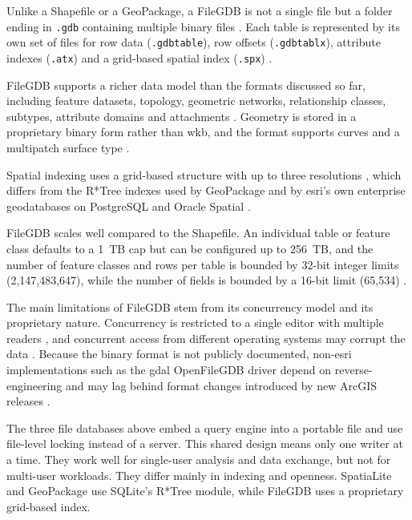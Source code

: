 Unlike a Shapefile or a GeoPackage, a FileGDB is not a single file but a folder ending in \texttt{.gdb} containing multiple binary files \parencite{rouault2013_filegdb_format_specification, gdal2025_openfilegdb_driver}. Each table is represented by its own set of files for row data (\texttt{.gdbtable}), row offsets (\texttt{.gdbtablx}), attribute indexes (\texttt{.atx}) and a grid-based spatial index (\texttt{.spx}) \parencite{rouault2013_filegdb_format_specification}.

FileGDB supports a richer data model than the formats discussed so far, including feature datasets, topology, geometric networks, relationship classes, subtypes, attribute domains and attachments \parencite{esri2024_file_geodatabases_overview}. Geometry is stored in a proprietary binary form rather than \acrshort{wkb}, and the format supports curves and a multipatch surface type \parencite{rouault2013_filegdb_format_specification}.

Spatial indexing uses a grid-based structure with up to three resolutions \parencite{rouault2013_filegdb_format_specification, esri2024_spatial_indexes}, which differs from the R*Tree indexes used by GeoPackage and by \acrshort{esri}'s own enterprise geodatabases on PostgreSQL and Oracle Spatial \parencite{esri2024_spatial_indexes}.

FileGDB scales well compared to the Shapefile. An individual table or feature class defaults to a 1~TB cap but can be configured up to 256~TB, and the number of feature classes and rows per table is bounded by 32-bit integer limits (2,147,483,647), while the number of fields is bounded by a 16-bit limit (65,534) \parencite{esri2024_file_geodatabase_size_limits}.

The main limitations of FileGDB stem from its concurrency model and its proprietary nature. Concurrency is restricted to a single editor with multiple readers \parencite{esri2024_types_of_geodatabases}, and concurrent access from different operating systems may corrupt the data \parencite{esri2024_file_geodatabase_api}. Because the binary format is not publicly documented, non-\acrshort{esri} implementations such as the \acrshort{gdal} OpenFileGDB driver depend on reverse-engineering and may lag behind format changes introduced by new ArcGIS releases \parencite{rouault2013_filegdb_format_specification, gdal2025_openfilegdb_driver}.

The three file databases above embed a query engine into a portable file and use file-level locking instead of a server. This shared design means only one writer at a time. They work well for single-user analysis and data exchange, but not for multi-user workloads. They differ mainly in indexing and openness. SpatiaLite and GeoPackage use SQLite's R*Tree module, while FileGDB uses a proprietary grid-based index. 

